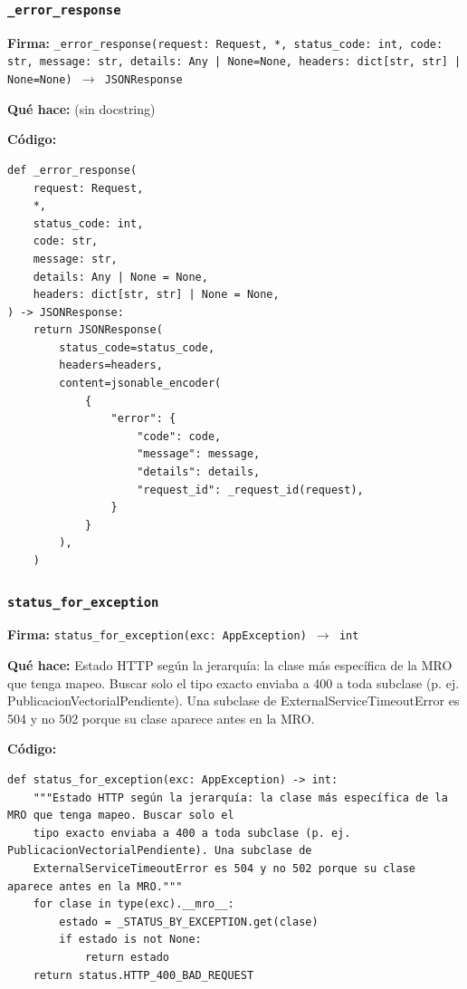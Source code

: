 \documentclass[11pt,a4paper]{article}
\begin{document}
\subsubsection*{\texttt{\_error\_response}}
\textbf{Firma:} \texttt{\_error\_response(request: Request, *, status\_code: int, code: str, message: str, details: Any | None=None, headers: dict[str, str] | None=None) $\rightarrow$ JSONResponse}

\textbf{Qué hace:} (sin docstring)

\textbf{Código:}
\begin{lstlisting}
def _error_response(
    request: Request,
    *,
    status_code: int,
    code: str,
    message: str,
    details: Any | None = None,
    headers: dict[str, str] | None = None,
) -> JSONResponse:
    return JSONResponse(
        status_code=status_code,
        headers=headers,
        content=jsonable_encoder(
            {
                "error": {
                    "code": code,
                    "message": message,
                    "details": details,
                    "request_id": _request_id(request),
                }
            }
        ),
    )
\end{lstlisting}

\subsubsection*{\texttt{status\_for\_exception}}
\textbf{Firma:} \texttt{status\_for\_exception(exc: AppException) $\rightarrow$ int}

\textbf{Qué hace:} Estado HTTP según la jerarquía: la clase más específica de la MRO que tenga mapeo. Buscar solo el
tipo exacto enviaba a 400 a toda subclase (p. ej. PublicacionVectorialPendiente). Una subclase de
ExternalServiceTimeoutError es 504 y no 502 porque su clase aparece antes en la MRO.

\textbf{Código:}
\begin{lstlisting}
def status_for_exception(exc: AppException) -> int:
    """Estado HTTP según la jerarquía: la clase más específica de la MRO que tenga mapeo. Buscar solo el
    tipo exacto enviaba a 400 a toda subclase (p. ej. PublicacionVectorialPendiente). Una subclase de
    ExternalServiceTimeoutError es 504 y no 502 porque su clase aparece antes en la MRO."""
    for clase in type(exc).__mro__:
        estado = _STATUS_BY_EXCEPTION.get(clase)
        if estado is not None:
            return estado
    return status.HTTP_400_BAD_REQUEST
\end{lstlisting}
\end{document}
